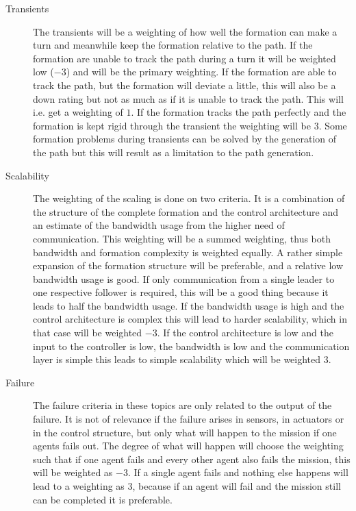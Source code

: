 \begin{description}
\item[Transients] The transients will be a weighting of how well the formation can make a turn and meanwhile keep the formation relative to the path. If the formation are unable to track the path during a turn it will be weighted low ($-3$) and will be the primary weighting. If the formation are able to track the path, but the formation will deviate a little, this will also be a down rating but not as much as if it is unable to track the path. This will i.e. get a weighting of $1$. If the formation tracks the path perfectly and the formation is kept rigid through the transient the weighting will be $3$. Some formation problems during transients can be solved by the generation of the path but this will result as a limitation to the path generation. 

\item[Scalability] The weighting of the scaling is done on two criteria. It is a combination of the structure of the complete formation and the control architecture and an estimate of the bandwidth usage from the higher need of communication. This weighting will be a summed weighting, thus both bandwidth and formation complexity is weighted equally. A rather simple expansion of the formation structure will be preferable, and a relative low bandwidth usage is good. If only communication from a single leader to one respective follower is required, this will be a good thing because it leads to half the bandwidth usage. If the bandwidth usage is high and the control architecture is complex this will lead to harder scalability, which in that case will be weighted $-3$. If the control architecture is low and the input to the controller is low, the bandwidth is low and the communication layer is simple this leads to simple scalability which will be weighted $3$.

\item[Failure]
The failure criteria in these topics are only related to the output of the failure. It is not of relevance if the failure arises in sensors, in actuators or in the control structure, but only what will happen to the mission if one agents fails out. The degree of what will happen will choose the weighting such that if one agent fails and every other agent also fails the mission, this will be weighted as $-3$. If a single agent fails and nothing else happens will lead to a weighting as $3$, because if an agent will fail and the mission still can be completed it is preferable.
\end{description}

